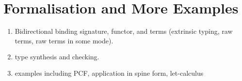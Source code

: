 
\section{Formalisation and More Examples} \label{sec:formalisation}
\begin{enumerate}
  \item Bidirectional binding signature, functor, and terms (extrinsic typing, raw terms, raw terms in some mode).
  \item type synthesis and checking.
  \item examples including PCF, application in spine form, let-calculus
\end{enumerate}
